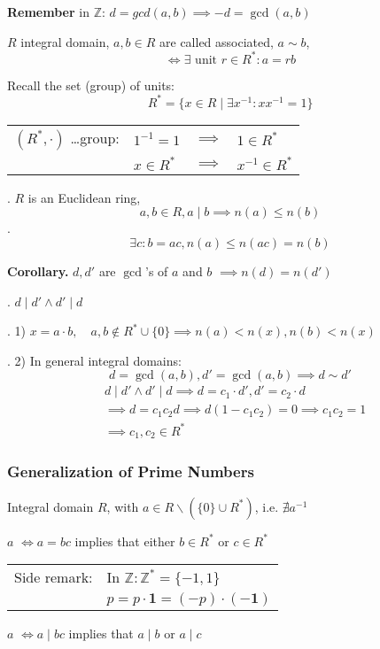 \textbf{Remember}
in $\mathbb{Z}$: $d = gcd(a,b) \implies -d = \gcd(a,b)$

\begin{definition}
$R$ integral domain,
$a,b \in R$ are called associated, $a \sim b$,
\[
  \Leftrightarrow \exists \text{ unit } r \in R^{*}: a = rb
\]
\end{definition}

Recall the set (group) of units:
\[
  R^{*} = \{ x \in R \mid \exists x^{-1} : xx^{-1} = 1\}
\]
\begin{tabular}{llll}
  $(R^{*}, \cdot)$ \ldots group:
    & $1^{-1} = 1 $ & $\implies$ & $1 \in R^{*}$ \\
    & $x\in R^{*} $ & $\implies$ & $x^{-1} \in R^{*}$
\end{tabular}

\Theorem.
$R$ is an Euclidean ring, \[ a,b\in R, a∣b \implies n(a) \leq n(b) \]
\Proof.
\[
  \exists c : b = ac, n(a) \leq n(ac) = n(b)
\]

\textbf{Corollary.}
$d, d'$ are $\gcd$'s of $a$ and $b$ $\implies n(d) = n(d')$

\Proof.
$d∣d' \land d'∣d$


\Remark.
1) $x = a\cdot b, \quad a,b\not\in R^{*} \cup \{0\} \implies n(a) < n(x), n(b) < n(x)$

\Remark.
2) In general integral domains:
\[
  d= \gcd(a,b), d' = \gcd(a,b) \implies d \sim d'
\]
\begin{align*}
  &d∣d' \land d'∣d \implies d = c_1\cdot d', d' = c_2 \cdot d \\
  &\implies d = c_1c_2 d \implies d (1-c_1c_2) = 0 \implies c_1 c_2 = 1\\
  &\implies c_1,c_2 \in R^{*}
\end{align*}

\subsubsection{Generalization of Prime Numbers}
\begin{definition}
  Integral domain $R$, with $a\in R \backslash (\{0\}\cup R^{*})$, i.e. $\nexists a^{-1}$

$a$  $\Leftrightarrow a = bc$ implies that either $b\in R^{*}$ or $c\in R^{*}$

\begin{tabular}{ll}
   Side remark: & In $\mathbb{Z}: \mathbb{Z}^{*} = \{-1, 1\}$\\
   & $p = p \cdot \mathbf{1} = (-p) \cdot (\mathbf{-1})$
\end{tabular}

$a$  $\Leftrightarrow a ∣ bc$ implies that $a∣b$ or $a∣c$
\end{definition}

